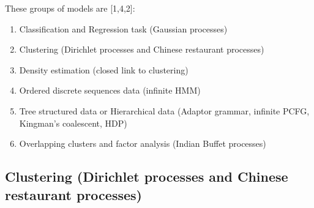 These groups of models are [1,4,2]:
\begin{enumerate}
  \item Classification and Regression task (Gaussian processes)
\item Clustering (Dirichlet processes and Chinese restaurant processes)
\item Density estimation (closed link to clustering)
\item Ordered discrete sequences data (infinite HMM)
\item Tree structured data or Hierarchical data (Adaptor grammar, infinite PCFG,
Kingman’s coalescent, HDP)
\item Overlapping clusters and factor analysis (Indian Buffet processes)
\end{enumerate}

\subsection{Clustering (Dirichlet processes and Chinese restaurant processes)}
\label{ssec:bnp-chinese}



    